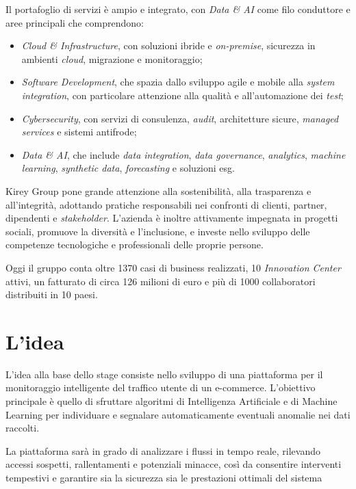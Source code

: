 Il portafoglio di servizi è ampio e integrato, con \emph{Data \& AI} come filo conduttore e aree principali che comprendono:

\begin{itemize}
    \item \emph{Cloud \& Infrastructure}, con soluzioni ibride e \emph{on-premise}, sicurezza in ambienti \emph{cloud}, migrazione e monitoraggio;
    \item \emph{Software Development}, che spazia dallo sviluppo agile e mobile alla \emph{system integration}, con particolare attenzione alla qualità e all'automazione dei \emph{test};
    \item \emph{Cybersecurity}, con servizi di consulenza, \emph{audit}, architetture sicure, \emph{managed services} e sistemi antifrode;
    \item \emph{Data \& AI}, che include \emph{data integration}, \emph{data governance}, \emph{analytics}, \emph{machine learning}, \emph{synthetic data}, \emph{forecasting} e soluzioni \gls{esg}.
\end{itemize}

Kirey Group pone grande attenzione alla sostenibilità, alla trasparenza e all'integrità, adottando pratiche responsabili nei confronti di clienti, partner, dipendenti e \emph{stakeholder}. 
L'azienda è inoltre attivamente impegnata in progetti sociali, promuove la diversità e l'inclusione, e investe nello sviluppo delle competenze tecnologiche e professionali delle proprie persone.

Oggi il gruppo conta oltre 1370 casi di business realizzati, 10 \emph{Innovation Center} attivi, un fatturato di circa 126 milioni di euro e più di 1000 collaboratori distribuiti in 10 paesi.


\section{L'idea}

L'idea alla base dello stage consiste nello sviluppo di una piattaforma per il monitoraggio intelligente del traffico utente di un e-commerce. L'obiettivo principale è quello di sfruttare algoritmi di Intelligenza Artificiale e di Machine Learning per individuare e segnalare automaticamente eventuali anomalie nei dati raccolti.

La piattaforma sarà in grado di analizzare i flussi in tempo reale, rilevando accessi sospetti, rallentamenti e potenziali minacce, così da consentire interventi tempestivi e garantire sia la sicurezza sia le prestazioni ottimali del sistema

